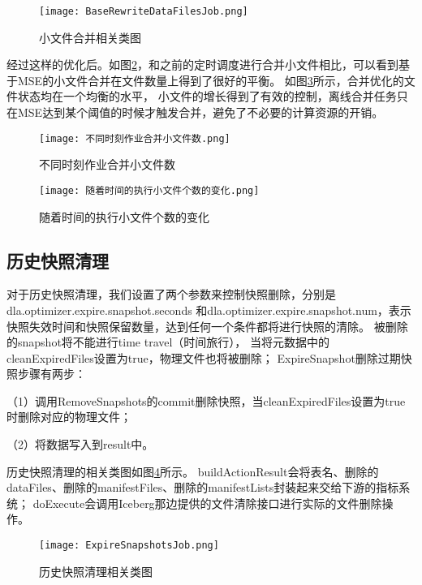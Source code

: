 \begin{figure}[H]
  \centering
  \texttt{[image: BaseRewriteDataFilesJob.png]}
  \caption{小文件合并相关类图}
  \label{fig:BaseRewriteDataFilesJob}
\end{figure}

经过这样的优化后。如图\ref{fig:不同时刻作业合并小文件数}，和之前的定时调度进行合并小文件相比，可以看到基于MSE的小文件合并在文件数量上得到了很好的平衡。
如图\ref{fig:随着时间的执行小文件个数的变化}所示，合并优化的文件状态均在一个均衡的水平，
小文件的增长得到了有效的控制，离线合并任务只在MSE达到某个阈值的时候才触发合并，避免了不必要的计算资源的开销。

\begin{figure}[H]
  \centering
  \texttt{[image: 不同时刻作业合并小文件数.png]}
  \caption{不同时刻作业合并小文件数}
  \label{fig:不同时刻作业合并小文件数}
\end{figure}

\begin{figure}[H]
  \centering
  \texttt{[image: 随着时间的执行小文件个数的变化.png]}
  \caption{随着时间的执行小文件个数的变化}
  \label{fig:随着时间的执行小文件个数的变化}
\end{figure}

\subsection{历史快照清理}

对于历史快照清理，我们设置了两个参数来控制快照删除，分别是dla.optimizer.expire.snapshot.seconds
和dla.optimizer.expire.snapshot.num，表示快照失效时间和快照保留数量，达到任何一个条件都将进行快照的清除。
被删除的snapshot将不能进⾏time travel（时间旅⾏），
当将元数据中的cleanExpiredFiles设置为true，物理⽂件也将被删除；
ExpireSnapshot删除过期快照步骤有两步：

（1）调⽤RemoveSnapshots的commit删除快照，当cleanExpiredFiles设置为true时删除对应的物理⽂件；

（2）将数据写⼊到result中。

历史快照清理的相关类图如图\ref{fig:ExpireSnapshotsJob}所示。
buildActionResult会将表名、删除的dataFiles、删除的manifestFiles、删除的manifestLists封装起来交给下游的指标系统；
doExecute会调用Iceberg那边提供的文件清除接口进行实际的文件删除操作。

\begin{figure}[H]
  \centering
  \texttt{[image: ExpireSnapshotsJob.png]}
  \caption{历史快照清理相关类图}
  \label{fig:ExpireSnapshotsJob}
\end{figure}

